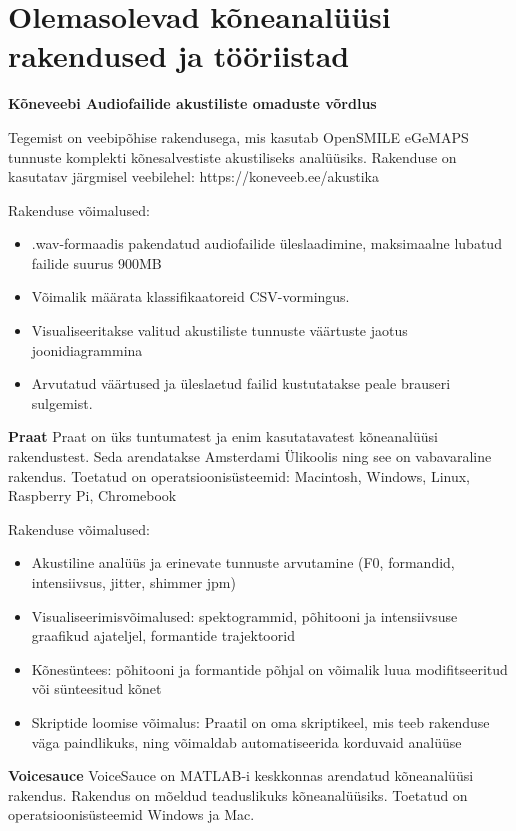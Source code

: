 \section{Olemasolevad kõneanalüüsi rakendused ja tööriistad}

\textbf{Kõneveebi Audiofailide akustiliste omaduste võrdlus}

Tegemist on veebipõhise rakendusega, mis kasutab OpenSMILE eGeMAPS tunnuste komplekti kõnesalvestiste akustiliseks analüüsiks. Rakenduse on kasutatav järgmisel veebilehel: https://koneveeb.ee/akustika

Rakenduse võimalused:
\begin{itemize}
    \item .wav-formaadis pakendatud audiofailide üleslaadimine, maksimaalne lubatud failide suurus 900MB
    \item Võimalik määrata klassifikaatoreid CSV-vormingus.
    \item Visualiseeritakse valitud akustiliste tunnuste väärtuste jaotus joonidiagrammina
    \item Arvutatud väärtused ja üleslaetud failid kustutatakse peale brauseri sulgemist.
\end{itemize} \cite{kõneveeb}

\textbf{Praat}
Praat on üks tuntumatest ja enim kasutatavatest kõneanalüüsi rakendustest. Seda arendatakse Amsterdami Ülikoolis ning see on vabavaraline rakendus. Toetatud on operatsioonisüsteemid: Macintosh, Windows, Linux, Raspberry Pi, Chromebook

Rakenduse võimalused:
\begin{itemize}
    \item Akustiline analüüs ja erinevate tunnuste arvutamine (F0, formandid, intensiivsus, jitter, shimmer jpm)
    \item Visualiseerimisvõimalused: spektogrammid, põhitooni ja intensiivsuse graafikud ajateljel, formantide trajektoorid
    \item Kõnesüntees: põhitooni ja formantide põhjal on võimalik luua modifitseeritud või sünteesitud kõnet
    \item Skriptide loomise võimalus: Praatil on oma skriptikeel, mis teeb rakenduse väga paindlikuks, ning võimaldab automatiseerida korduvaid analüüse
\end{itemize} \cite{praat}


\textbf{Voicesauce}
VoiceSauce on MATLAB-i keskkonnas arendatud kõneanalüüsi rakendus. Rakendus on mõeldud teaduslikuks kõneanalüüsiks. Toetatud on operatsioonisüsteemid Windows ja Mac.

